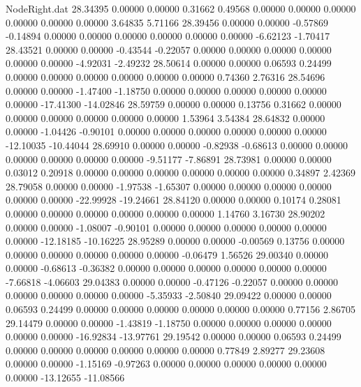 \begin{filecontents}{NodeRight.dat}
  28.34395    0.00000    0.00000     0.31662    0.49568    0.00000    0.00000    0.00000    0.00000    0.00000    0.00000    3.64835    5.71166
  28.39456    0.00000    0.00000    -0.57869   -0.14894    0.00000    0.00000    0.00000    0.00000    0.00000    0.00000   -6.62123   -1.70417
  28.43521    0.00000    0.00000    -0.43544   -0.22057    0.00000    0.00000    0.00000    0.00000    0.00000    0.00000   -4.92031   -2.49232
  28.50614    0.00000    0.00000     0.06593    0.24499    0.00000    0.00000    0.00000    0.00000    0.00000    0.00000    0.74360    2.76316
  28.54696    0.00000    0.00000    -1.47400   -1.18750    0.00000    0.00000    0.00000    0.00000    0.00000    0.00000  -17.41300  -14.02846
  28.59759    0.00000    0.00000     0.13756    0.31662    0.00000    0.00000    0.00000    0.00000    0.00000    0.00000    1.53964    3.54384
  28.64832    0.00000    0.00000    -1.04426   -0.90101    0.00000    0.00000    0.00000    0.00000    0.00000    0.00000  -12.10035  -10.44044
  28.69910    0.00000    0.00000    -0.82938   -0.68613    0.00000    0.00000    0.00000    0.00000    0.00000    0.00000   -9.51177   -7.86891
  28.73981    0.00000    0.00000     0.03012    0.20918    0.00000    0.00000    0.00000    0.00000    0.00000    0.00000    0.34897    2.42369
  28.79058    0.00000    0.00000    -1.97538   -1.65307    0.00000    0.00000    0.00000    0.00000    0.00000    0.00000  -22.99928  -19.24661
  28.84120    0.00000    0.00000     0.10174    0.28081    0.00000    0.00000    0.00000    0.00000    0.00000    0.00000    1.14760    3.16730
  28.90202    0.00000    0.00000    -1.08007   -0.90101    0.00000    0.00000    0.00000    0.00000    0.00000    0.00000  -12.18185  -10.16225
  28.95289    0.00000    0.00000    -0.00569    0.13756    0.00000    0.00000    0.00000    0.00000    0.00000    0.00000   -0.06479    1.56526
  29.00340    0.00000    0.00000    -0.68613   -0.36382    0.00000    0.00000    0.00000    0.00000    0.00000    0.00000   -7.66818   -4.06603
  29.04383    0.00000    0.00000    -0.47126   -0.22057    0.00000    0.00000    0.00000    0.00000    0.00000    0.00000   -5.35933   -2.50840
  29.09422    0.00000    0.00000     0.06593    0.24499    0.00000    0.00000    0.00000    0.00000    0.00000    0.00000    0.77156    2.86705
  29.14479    0.00000    0.00000    -1.43819   -1.18750    0.00000    0.00000    0.00000    0.00000    0.00000    0.00000  -16.92834  -13.97761
  29.19542    0.00000    0.00000     0.06593    0.24499    0.00000    0.00000    0.00000    0.00000    0.00000    0.00000    0.77849    2.89277
  29.23608    0.00000    0.00000    -1.15169   -0.97263    0.00000    0.00000    0.00000    0.00000    0.00000    0.00000  -13.12655  -11.08566

\end{filecontents}

